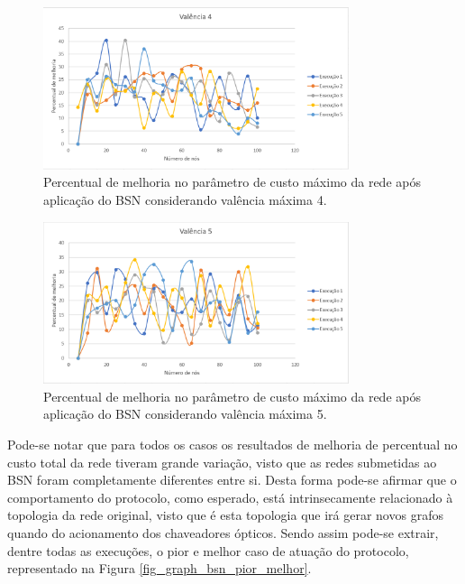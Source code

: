 \begin{figure} [ht]%
	\centering
	\includegraphics[width=0.8\textwidth]{./figuras/BSN-valencia4-5exec-grafico.png} %
		\caption[Melhoria de custo máximo com valência 4]{Percentual de melhoria no parâmetro de custo máximo da rede após aplicação do BSN considerando valência máxima 4.}
		\label{fig_graph_bsn_val4}
\end{figure}

\begin{figure} [ht]%
	\centering
	\includegraphics[width=0.8\textwidth]{./figuras/BSN-valencia5-5exec-grafico.png} %
	\caption[Melhoria de custo máximo com valência 5]{Percentual de melhoria no parâmetro de custo máximo da rede após aplicação do BSN considerando valência máxima 5.}
	\label{fig_graph_bsn_val5}
\end{figure}

Pode-se notar que para todos os casos os resultados de melhoria de percentual no custo total da rede tiveram grande variação, visto que as redes submetidas ao BSN foram completamente diferentes entre si. Desta forma pode-se afirmar que o comportamento do protocolo, como esperado, está intrinsecamente relacionado à topologia da rede original, visto que é esta topologia que irá gerar novos grafos quando do acionamento dos chaveadores ópticos. Sendo assim pode-se extrair, dentre todas as execuções, o pior e melhor caso de atuação do protocolo, representado na Figura \ref{fig_graph_bsn_pior_melhor}.

